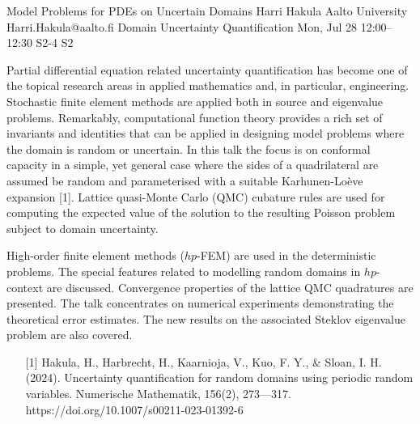\begin{talk}
  {Model Problems for PDEs on Uncertain Domains}%
  {Harri Hakula}%
  {Aalto University}%
  {Harri.Hakula@aalto.fi}%
  {Domain Uncertainty Quantification}%
  {}%
  {Mon, Jul 28 12:00–12:30}%
  {S2-4}%
  {S2}%
				
			
Partial differential equation related uncertainty quantification has become one of the
topical research areas in applied mathematics and, in particular, engineering.
Stochastic finite element methods are applied both in source and eigenvalue problems.
Remarkably, computational function theory provides a rich set of invariants 
and identities that
can be applied in designing model problems where the domain is random or uncertain. 
In this talk the focus is on conformal capacity in a simple, 
yet general case where the sides of a quadrilateral are assumed be random 
and parameterised with a suitable Karhunen-Loève expansion [1].
Lattice quasi-Monte Carlo (QMC) cubature rules are used for computing the expected value of the solution to the resulting Poisson problem subject to domain uncertainty. 

High-order finite element methods ($hp$-FEM) are used in the deterministic problems.
The special features related to modelling random domains in $hp$-context are discussed.
Convergence properties of the lattice QMC quadratures are presented. The talk
concentrates on numerical experiments demonstrating the theoretical error estimates.
The new results on the associated Steklov eigenvalue problem are also covered.


\medskip

\begin{enumerate}
	\item[{[1]}] Hakula, H., Harbrecht, H., Kaarnioja, V., Kuo, F. Y., \& Sloan, I. H. (2024). Uncertainty quantification for random domains using periodic random variables. Numerische Mathematik, 156(2), 273---317. https://doi.org/10.1007/s00211-023-01392-6
\end{enumerate}

\end{talk}

